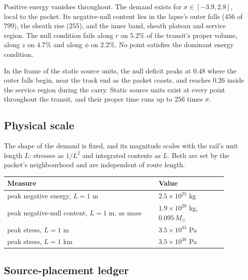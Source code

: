 \documentclass[11pt]{article}
\newcommand{\sig}{\sigma}
\begin{document}
Positive energy vanishes throughout. The demand exists for $\sig\in[-3.9,2.8]$, local to the packet. Its negative-null content lies in the lapse's outer falls ($456$ of $799$), the sheath rise ($255$), and the inner band, sheath plateau and service region. The null condition fails along $r$ on $5.2\%$ of the transit's proper volume, along $z$ on $4.7\%$ and along $\phi$ on $2.2\%$. No point satisfies the dominant energy condition.

In the frame of the static source units, the null deficit peaks at $0.48$ where the outer falls begin, near the track end as the packet coasts, and reaches $0.26$ inside the service region during the carry. Static source units exist at every point throughout the transit, and their proper time runs up to $256$ times $\sig$.

\subsection{Physical scale}

The shape of the demand is fixed, and its magnitude scales with the rail's unit length $L$: stresses as $1/L^2$ and integrated contents as $L$. Both are set by the packet's neighbourhood and are independent of route length.

\begin{longtable}{L{0.62\linewidth}L{0.28\linewidth}}
\toprule
\textbf{Measure} & \textbf{Value} \\
\midrule
peak negative energy, $L=1$ m & $2.5\times10^{23}$ kg \\
peak negative-null content, $L=1$ m, as mass & $1.9\times10^{29}$ kg, $0.095\,M_\odot$ \\
peak stress, $L=1$ m & $3.5\times10^{44}$ Pa \\
peak stress, $L=1$ km & $3.5\times10^{38}$ Pa \\
\bottomrule
\end{longtable}

\subsection{Source-placement ledger}
\end{document}
